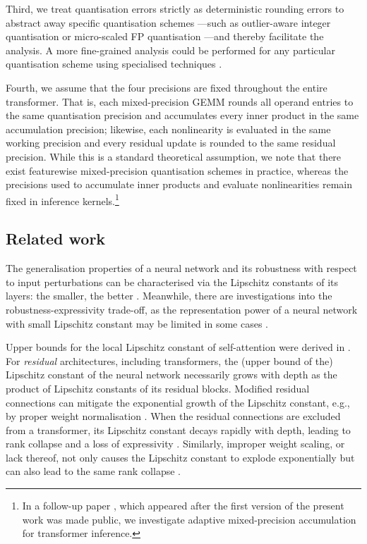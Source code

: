 \documentclass[namedate,webpdf,imanum]{ima-authoring-template}
\numberwithin{equation}{section}
\begin{document}
Third, we treat quantisation errors strictly as deterministic rounding errors to abstract away specific quantisation schemes \citep{gholami2022survey}---such as outlier-aware integer quantisation \citep{dettmers2022gpt3} or micro-scaled FP quantisation \citep{rouhani2023microscaling}---and thereby facilitate the analysis.
A more fine-grained analysis could be performed for any particular quantisation scheme using specialised techniques \citep{abdelfattah2025analysis}.

Fourth, we assume that the four precisions are fixed throughout the entire transformer.
That is, each mixed-precision GEMM rounds all operand entries to the same quantisation precision and accumulates every inner product in the same accumulation precision; likewise, each nonlinearity is evaluated in the same working precision and every residual update is rounded to the same residual precision.
While this is a standard theoretical assumption, we note that there exist featurewise mixed-precision quantisation schemes \citep{dettmers2022gpt3} in practice, whereas the precisions used to accumulate inner products and evaluate nonlinearities remain fixed in inference kernels.\footnote{In a follow-up paper \citep{budzinskiy2026lamp}, which appeared after the first version of the present work was made public, we investigate adaptive mixed-precision accumulation for transformer inference.}

\subsection{Related work}
The generalisation properties of a neural network and its robustness with respect to input perturbations can be characterised via the Lipschitz constants of its layers: the smaller, the better \citep{bartlett2017spectrally, cisse2017parseval, weng2018evaluating, gouk2021regularisation}.
Meanwhile, there are investigations into the robustness-expressivity trade-off, as the representation power of a neural network with small Lipschitz constant may be limited in some cases \citep{tsipras2018robustness, anil2019sorting, bethune2022pay}.

Upper bounds for the local Lipschitz constant of self-attention were derived in \cite{kim2021lipschitz, castin2024smooth, yudin2025pay}.
For \emph{residual} architectures, including transformers, the (upper bound of the) Lipschitz constant of the neural network necessarily grows with depth as the product of Lipschitz constants of its residual blocks.
Modified residual connections can mitigate the exponential growth of the Lipschitz constant, e.g., by proper weight normalisation \citep{bachlechner2021rezero, wang2024deepnet, newhouse2025training}.
When the residual connections are excluded from a transformer, its Lipschitz constant decays rapidly with depth, leading to rank collapse and a loss of expressivity \citep{dong2021attention}.
Similarly, improper weight scaling, or lack thereof, not only causes the Lipschitz constant to explode exponentially but can also lead to the same rank collapse \citep{noci2022signal}.
\end{document}
